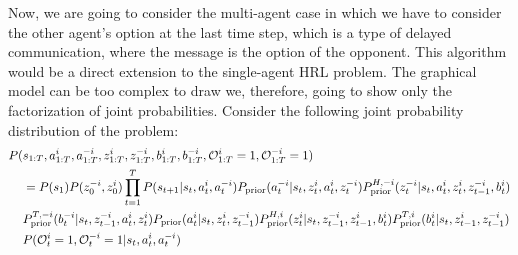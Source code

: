 \label{sec:chap4-multi-soft-HRL-communication}
Now, we are going to consider the multi-agent case in which we have to consider the other agent's option at the last time step, which is a type of delayed communication, where the message is the option of the opponent. This algorithm would be a direct extension to the single-agent HRL problem. The graphical model can be too complex to draw we, therefore, going to show only the factorization of joint probabilities. Consider the following joint probability distribution of the problem:
\begin{equation}
\begin{aligned}
    P(&s_{1:T}, a^i_{1:T}, a^{-i}_{1:T}, z^i_{1:T}, z^{-i}_{1:T}, b^i_{1:T}, b^{-i}_{1:T}, \mathcal{O}^i_{1:T} = 1, \mathcal{O}^{-i}_{1:T} = 1) \\
    &= P(s_1)P(z^{-i}_0, z^i_0)\prod^T_{t=1} P(s_{t+1} | s_t, a_t^i, a_t^{-i})P_{\text{prior}}(a^{-i}_t | s_t, z^i_t, a^i_t, z^{-i}_t) P^{H,-i}_{\text{prior}}(z^{-i}_t | s_t, a^i_t, z^i_t, z^{-i}_{t-1}, b^i_t) \\
    &P^{T,-i}_{\text{prior}}(b^{-i}_t | s_t,  z^{-i}_{t-1}, a^i_t, z^i_t) P_{\text{prior}}(a^i_t | s_t, z^i_t, z^{-i}_{t-1}) P^{H,i}_{\text{prior}}(z^i_t | s_t, z^{-i}_{t-1}, z^i_{t-1}, b^i_t) P^{T,i}_{\text{prior}}(b^i_t | s_t, z^i_{t-1}, z^{-i}_{t-1})\\
    &P(\mathcal{O}^i_t = 1, \mathcal{O}^{-i}_t = 1 | s_t, a^i_t, a^{-i}_t)
\end{aligned}
\end{equation}
